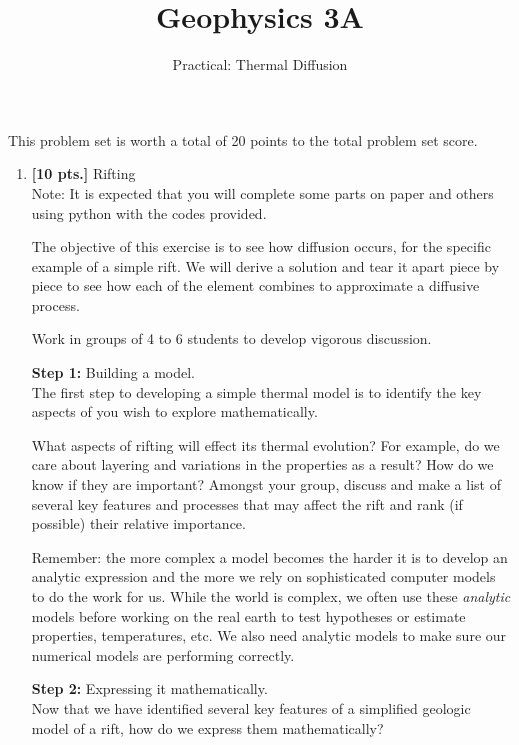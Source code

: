 \documentclass[11pt,a4paper,final]{article}
\title{Geophysics 3A}
\author{Practical: Thermal Diffusion}
\begin{document}
\maketitle

\noindent This problem set is worth a total of 20 points to the total problem set score.
\begin{enumerate}
    

    

    \item \label{itm:rifting} {\bf [10 pts.]} Rifting \\
    Note: It is expected that you will complete some parts on paper and others using python with the codes provided.

    The objective of this exercise is to see how diffusion occurs, for the specific example of a simple rift.  We will derive a solution and tear it apart piece by piece to see how each of the element combines to approximate a diffusive process.

    Work in groups of 4 to 6 students to develop vigorous discussion.


    \vspace{2em}
    {\bf Step 1:} Building a model. \\
    The first step to developing a simple thermal model is to identify the key aspects of you wish to explore mathematically.

    What aspects of rifting will effect its thermal evolution?  For example, do we care about layering and variations in the properties as a result?  How do we know if they are important?  Amongst your group, discuss and make a list of several key features and processes that may affect the rift and rank (if possible) their relative importance.

    Remember: the more complex a model becomes the harder it is to develop an analytic expression and the more we rely on sophisticated computer models to do the work for us.  While the world is complex, we often use these {\it analytic} models before working on the real earth to test hypotheses or estimate properties, temperatures, etc.  We also need analytic models to make sure our numerical models are performing correctly.


    \vspace{1em}
    {\bf Step 2:} Expressing it mathematically. \\
    Now that we have identified several key features of a simplified geologic model
    of a rift, how do we express them mathematically?


\end{enumerate}
\end{document}
